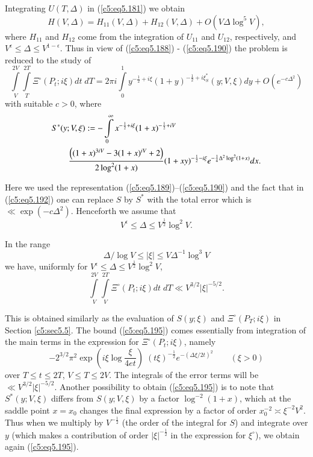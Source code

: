 Integrating $U(T,\Delta)$ in (\ref{c5:eq5.181}) we obtain
\begin{equation}
H(V,\Delta) = H_{11}(V,\Delta) + H_{12} (V,\Delta) + O \left(V\Delta \log^5
V\right), \label{c5:eq5.191} 
\end{equation}
where $H_{11}$ and $H_{12}$ come from the integration of $U_{11}$ and
$U_{12}$, respectively, and $V^{\epsilon} \leq \Delta \leq
V^{1-\epsilon}$. Thus in view of (\ref{c5:eq5.188}) -
(\ref{c5:eq5.190}) the problem is reduced to the study of  
\begin{equation}
\int\limits^{2V}_V \int\limits^{2T}_T \Xi^\circ (P_t ; i\xi) dt \; dT
= 2 \pi i \int\limits^1_0 y^{-\frac{1}{2} + i \xi} (1+y)^{-\frac{1}{2}
  + i \xi_S^*} (y;V,\xi) dy + O(e^{-c\Delta^2})
\label{c5:eq5.192} 
\end{equation}\pageoriginale
with suitable $c > 0$, where
\begin{align}
& S^* (y;V,\xi) : =
- \int\limits^\infty_0 x^{-\frac{1}{2} + i\xi} (1+x)^{-\frac{1}{2} +
  iV}\label{c5:eq5.193}\\ 
& \qquad  \frac{\left((1+x)^{3iV} - 3 (1+x)^{iV} + 2\right)}{2 \log^2
  (1+x)} (1+xy)^{-\frac{1}{2} - i \xi} e^{-\frac{1}{4} \Delta^2 \log^2
  (1+x)} dx.\notag  
\end{align}

Here we used the representation (\ref{c5:eq5.189})--(\ref{c5:eq5.190})
and the fact that in (\ref{c5:eq5.192}) one can 
replace $S$ by $S^*$ with the total error which is\break $\ll \exp
(-c\Delta^2)$. Henceforth we assume that  
$$
V^{\epsilon} \leq \Delta \leq V^{\frac{1}{2}} \log^2 V. 
$$

In the range
\begin{equation}
\Delta/\log V \leq |\xi| \leq V \Delta^{-1} \log^3 V\label{c5:eq5.194} 
\end{equation}
we have, uniformly for $V^\epsilon \leq \Delta \leq V^{\frac{1}{2}}
\log^2 V$, 
\begin{equation}
\int\limits^{2V}_V \int\limits^{2T}_V \Xi^\circ (P_t ;i\xi) dt \; dT
\ll V^{3/2} |\xi|^{-5/2}.\label{c5:eq5.195} 
\end{equation}

This is obtained similarly as the evaluation of $S(y;\xi)$ and
$\Xi^\circ (P_T;i\xi)$ in Section \ref{c5:sec5.5}. The bound
(\ref{c5:eq5.195}) comes essentially from integration of the main
terms in the expression for $\Xi^{\circ} (P_t ; i\xi)$, namely 
\begin{equation*}
-2^{3/2} \pi^2 \exp \left(i\xi \log \frac{\xi}{4et} \right) \; (t
\xi)^{-\frac{1}{2}} e^{-(\Delta \xi / 2 t)^2} \qquad (\xi > 0) 
\end{equation*}
over $T \leq t \leq 2T$, $V \leq T \leq 2V$. The integrals of the
error terms will be $\ll V^{3/2} |\xi|^{-5/2}$. Another possibility to
obtain (\ref{c5:eq5.195}) is to note that $S^*(y;V,\xi)$ differs from
$S(y;V,\xi)$ by a factor $\log^{-2}(1+x)$, which at the saddle point
$x = x_0$ changes the final expression by a factor of order $x^{-2}_0
\asymp \xi^{-2} V^2$. Thus when we multiply by $V^{-\frac{1}{2}}$ (the
order of the integral for $S$) and integrate over $y$ (which makes a
contribution of order $|\xi|^{-\frac{1}{2}}$ in the expression for
$\xi^\circ$), we obtain again (\ref{c5:eq5.195}). 

